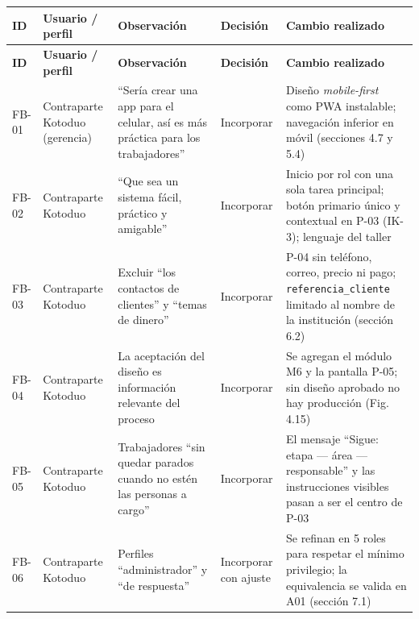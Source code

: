 \documentclass[11pt,a4paper]{article}
\begin{document}
\begingroup\small
\begin{longtable}{@{}>{\raggedright\arraybackslash\hspace{0pt}}p{}>{\raggedright\arraybackslash\hspace{0pt}}p{}>{\raggedright\arraybackslash\hspace{0pt}}p{}>{\raggedright\arraybackslash\hspace{0pt}}p{}>{\raggedright\arraybackslash\hspace{0pt}}p{}@{}}
\toprule
\textbf{ID} & \textbf{Usuario / perfil} & \textbf{Observación} & \textbf{Decisión} & \textbf{Cambio realizado} \\ \midrule
\endfirsthead
\toprule
\textbf{ID} & \textbf{Usuario / perfil} & \textbf{Observación} & \textbf{Decisión} & \textbf{Cambio realizado} \\ \midrule
\endhead
\bottomrule
\endlastfoot
\mbox{FB-01} & Contraparte Kotoduo (gerencia) & ``Sería crear una app para el celular, así es más práctica para los trabajadores'' & \mbox{Incorporar} & Diseño \textit{mobile-first} como PWA instalable; navegación inferior en móvil (secciones 4.7 y 5.4) \\ \addlinespace[0.25em]
\mbox{FB-02} & Contraparte Kotoduo & ``Que sea un sistema fácil, práctico y amigable'' & \mbox{Incorporar} & Inicio por rol con una sola tarea principal; botón primario único y contextual en \mbox{P-03} (\mbox{IK-3}); lenguaje del taller \\ \addlinespace[0.25em]
\mbox{FB-03} & Contraparte Kotoduo & Excluir ``los contactos de clientes'' y ``temas de dinero'' & \mbox{Incorporar} & \mbox{P-04} sin teléfono, correo, precio ni pago; \texttt{referencia\_\allowbreak{}cliente} limitado al nombre de la institución (sección 6.2) \\ \addlinespace[0.25em]
\mbox{FB-04} & Contraparte Kotoduo & La aceptación del diseño es información relevante del proceso & \mbox{Incorporar} & Se agregan el módulo M6 y la pantalla \mbox{P-05}; sin diseño aprobado no hay producción (Fig. 4.15) \\ \addlinespace[0.25em]
\mbox{FB-05} & Contraparte Kotoduo & Trabajadores ``sin quedar parados cuando no estén las personas a cargo'' & \mbox{Incorporar} & El mensaje ``Sigue: etapa --- área --- responsable'' y las instrucciones visibles pasan a ser el centro de \mbox{P-03} \\ \addlinespace[0.25em]
\mbox{FB-06} & Contraparte Kotoduo & Perfiles ``administrador'' y ``de respuesta'' & Incorporar con ajuste & Se refinan en 5 roles para respetar el mínimo privilegio; la equivalencia se valida en A01 (sección 7.1) \\
\end{longtable}
\endgroup
\end{document}
